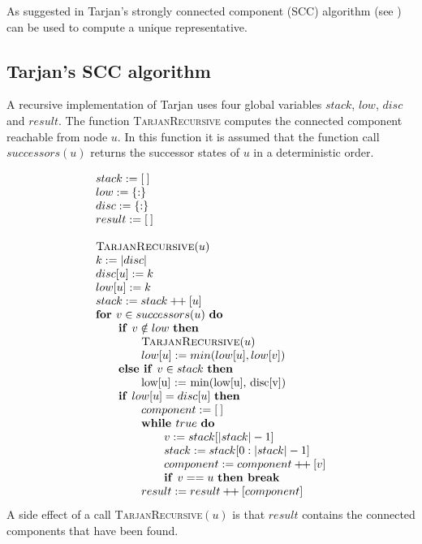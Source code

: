 \documentclass{article}
\newcommand{\concat}{\ensuremath{+\!\!+\:}}
\newcommand{\emptymap}{\ensuremath{\{ : \}}}
\newcommand{\emptylist}{\ensuremath{[\:]}}
\newcommand{\If}{\text{\textbf{if }}}
\newcommand{\Do}{\text{\textbf{do }}}
\newcommand{\Then}{\text{\textbf{then }}}
\newcommand{\Else}{\text{\textbf{else }}}
\newcommand{\For}{\text{\textbf{for }}}
\newcommand{\While}{\text{\textbf{while }}}
\newcommand{\Break}{\text{\textbf{break }}}
\begin{document}
As suggested in \cite{DBLP:conf/cav/BlomP02} Tarjan's strongly connected component (SCC) algorithm (see \cite{Tarjan72depthfirst}) can be used to compute a unique representative.

\subsection{Tarjan's SCC algorithm}
A recursive implementation of Tarjan uses four global variables $stack$, $low$, $disc$ and $result$. The function
\textsc{TarjanRecursive} computes the connected component reachable from node $u$. In this function it is assumed that the function call $successors(u)$ returns the successor states of $u$ in a deterministic order.

\[
\begin{tabular}{l}
$stack := \emptylist$ \\
$low := \emptymap$ \\
$disc := \emptymap$ \\
$result := \emptylist$ \\
\\
\textsc{TarjanRecursive}$(u)$ \\
$k := |disc|$ \\
$disc[u] := k$ \\
$low[u] := k$ \\
$stack := stack \concat [u]$ \\
\For $v \in successors(u)$ \Do \\
\qquad \If $v \notin low$ \Then \\
\qquad \qquad \textsc{TarjanRecursive}$(u)$ \\
\qquad \qquad $low[u] := min(low[u], low[v])$ \\
\qquad \Else \If $v \in stack$ \Then \\
\qquad \qquad low[u] := min(low[u], disc[v]) \\
\qquad \If $low[u] = disc[u]$ \Then \\
\qquad \qquad $component := \emptylist$ \\
\qquad \qquad \While $true$ \Do \\
\qquad \qquad \qquad $v := stack[|stack| - 1]$ \\
\qquad \qquad \qquad $stack := stack[0:|stack| - 1]$ \\
\qquad \qquad \qquad $component := component \concat [v]$ \\
\qquad \qquad \qquad \If $v == u$ \Then \Break \\
\qquad \qquad $result := result \concat [component]$ \\
\end{tabular}
\]
A side effect of a call \textsc{TarjanRecursive}$(u)$ is that $result$ contains the connected components that have been found.
\end{document}
